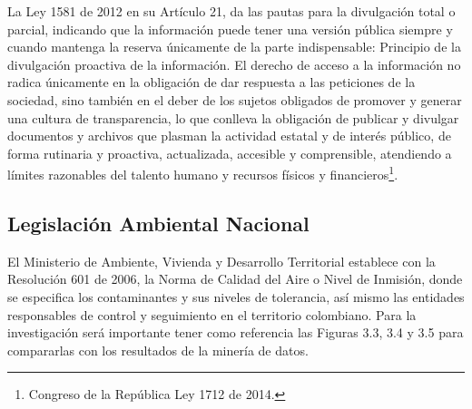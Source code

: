 \documentclass[a4paper,openright,12pt]{book}
\theoremstyle{definition}
\theoremstyle{remark}
\begin{document}
La Ley 1581 de 2012 en su Artículo 21, da las pautas para la divulgación total o parcial, indicando que la información puede tener una versión pública siempre y cuando mantenga la reserva únicamente de la parte indispensable:
Principio de la divulgación proactiva de la información. El derecho de acceso a la información no radica únicamente en la obligación de dar respuesta a las peticiones de la sociedad, sino también en el deber de los sujetos obligados de promover y generar una cultura de transparencia, lo que conlleva la obligación de publicar y divulgar documentos y archivos que plasman la actividad estatal y de interés público, de forma rutinaria y proactiva, actualizada, accesible y comprensible, atendiendo a límites razonables del talento humano y recursos físicos y financieros\footnote{Congreso de la República Ley 1712 de 2014.}.
\subsection{Legislación Ambiental Nacional}
El Ministerio de Ambiente, Vivienda y Desarrollo Territorial establece con la Resolución 601 de 2006, la Norma de Calidad del Aire o Nivel de Inmisión, donde se especifica los contaminantes y sus niveles de tolerancia, así mismo las entidades responsables de control y seguimiento en el territorio colombiano. Para la investigación será importante tener como referencia las Figuras 3.3, 3.4 y 3.5 para compararlas con los resultados de la minería de datos.
\end{document}
